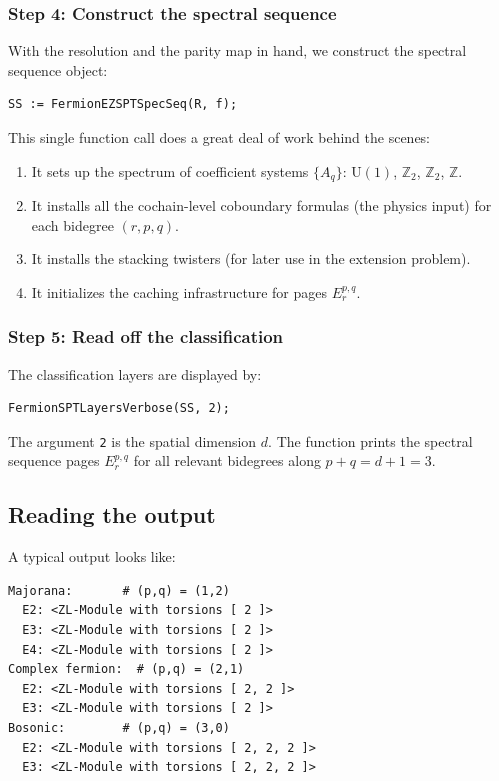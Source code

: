\documentclass{SciPost}
\theoremstyle{definition}
\newcommand{\Z}{\mathbb{Z}}
\newcommand{\Zt}{\mathbb{Z}_2}
\newcommand{\U}{\mathrm{U}}
\begin{document}
\subsubsection{Step 4: Construct the spectral sequence}

With the resolution and the parity map in hand, we construct the spectral sequence object:
\begin{verbatim}
SS := FermionEZSPTSpecSeq(R, f);
\end{verbatim}
This single function call does a great deal of work behind the scenes:
\begin{enumerate}[label=(\alph*)]
    \item It sets up the spectrum of coefficient systems $\{A_q\}$: $\U(1)$, $\Zt$, $\Zt$, $\Z$.
    \item It installs all the cochain-level coboundary formulas (the physics input) for each bidegree $(r, p, q)$.
    \item It installs the stacking twisters (for later use in the extension problem).
    \item It initializes the caching infrastructure for pages $E_r^{p,q}$.
\end{enumerate}

\subsubsection{Step 5: Read off the classification}

The classification layers are displayed by:
\begin{verbatim}
FermionSPTLayersVerbose(SS, 2);
\end{verbatim}
The argument \texttt{2} is the spatial dimension $d$.
The function prints the spectral sequence pages $E_r^{p,q}$ for all relevant bidegrees along $p + q = d + 1 = 3$.


\subsection{Reading the output}
\label{subsec:reading-output}

A typical output looks like:
\begin{verbatim}
Majorana:       # (p,q) = (1,2)
  E2: <ZL-Module with torsions [ 2 ]>
  E3: <ZL-Module with torsions [ 2 ]>
  E4: <ZL-Module with torsions [ 2 ]>
Complex fermion:  # (p,q) = (2,1)
  E2: <ZL-Module with torsions [ 2, 2 ]>
  E3: <ZL-Module with torsions [ 2 ]>
Bosonic:        # (p,q) = (3,0)
  E2: <ZL-Module with torsions [ 2, 2, 2 ]>
  E3: <ZL-Module with torsions [ 2, 2, 2 ]>
\end{verbatim}
\end{document}
